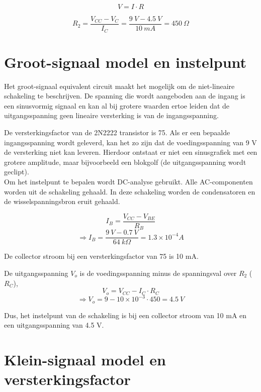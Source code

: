 \documentclass{article}
\begin{document}
\begin{equation}
V = I \cdot R 
\end{equation}

$$R_2 = \frac{V_{CC}-V_C}{I_C} = \frac{9\:V-4.5\:V}{10\:mA}=450\: \Omega$$

\section*{Groot-signaal model en instelpunt}

Het groot-signaal equivalent circuit maakt het mogelijk om de niet-lineaire schakeling te beschrijven. De spanning die wordt aangeboden aan de ingang is een sinusvormig signaal en kan al bij grotere waarden ertoe leiden dat de uitgangsspanning geen lineaire versterking is van de ingangsspanning.

De versterkingsfactor van de 2N2222 transistor is 75. Als er een bepaalde ingangsspanning wordt geleverd, kan het zo zijn dat de voedingsspanning van 9 V de versterking niet kan leveren. Hierdoor ontstaat er niet een sinusgrafiek met een grotere amplitude, maar bijvoorbeeld een blokgolf (de uitgangsspanning wordt geclipt).\\

Om het instelpunt te bepalen wordt DC-analyse gebruikt. Alle AC-componenten worden uit de schakeling gehaald. In deze schakeling worden de condensatoren en de wisselspanningsbron eruit gehaald.

\begin{equation}
I_B=\frac{V_{CC}-V_{BE}}{R_B}
\end{equation}
$$\Rightarrow I_B=\frac{9\: V-0.7 \: V}{64 \: k \Omega}=1.3\times 10^{-4}A$$

\noindent De collector stroom bij een versterkingsfactor van 75 is 10 mA. 

\noindent De uitgangsspanning $V_o$ is de voedingsspanning minus de spanningsval over $R_2$ ($R_C$),
\begin{equation}
V_o=V_{CC}-I_{C} \cdot R_{C}
\end{equation}
$$\Rightarrow V_o=9-10\times 10^{-3}\cdot 450=4.5 \: V$$

\noindent Dus, het instelpunt van de schakeling is bij een collector stroom van 10 mA en een uitgangsspanning van 4.5 V.

\section*{Klein-signaal model en versterkingsfactor}
\end{document}

